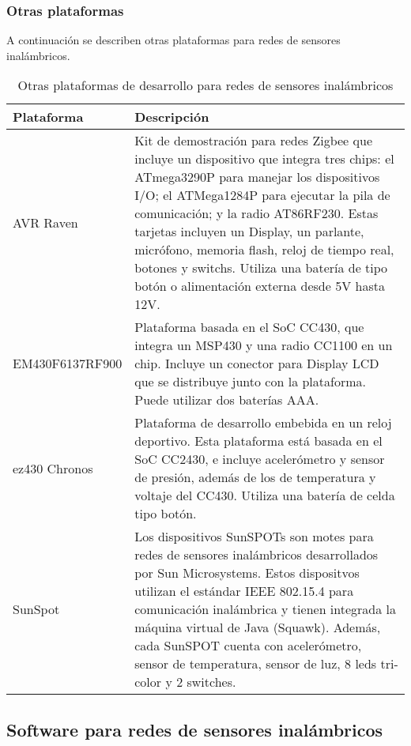 \subsubsection{Otras plataformas}
A continuación se describen otras plataformas para redes de sensores inalámbricos.
\begin{table}[H]
\centering
\caption{Otras plataformas de desarrollo para redes de sensores inalámbricos}
\begin{tabular}{|l|p{10cm}|}
\hline \textbf{Plataforma} & \textbf{Descripción} \\ 
\hline AVR Raven & Kit de demostración para redes Zigbee que incluye un dispositivo que integra tres chips: el ATmega3290P para manejar los dispositivos I/O; el ATMega1284P para ejecutar la pila de comunicación; y la radio AT86RF230. Estas tarjetas incluyen un Display, un parlante, micrófono, memoria flash, reloj de tiempo real, botones y switchs. Utiliza una batería de tipo botón o alimentación externa desde 5V hasta 12V.\\
\hline EM430F6137RF900 & Plataforma basada en el SoC CC430, que integra un MSP430 y una radio CC1100 en un chip. Incluye un conector para Display LCD que se distribuye junto con la plataforma. Puede utilizar dos baterías AAA. \\ 
\hline ez430 Chronos & Plataforma de desarrollo embebida en un reloj deportivo. Esta plataforma está basada en el SoC CC2430, e incluye acelerómetro y sensor de presión, además de los de temperatura y voltaje del CC430. Utiliza una batería de celda tipo botón.\\ 
\hline SunSpot & Los dispositivos SunSPOTs son motes para redes de sensores inalámbricos desarrollados por Sun Microsystems. Estos dispositvos utilizan el estándar IEEE 802.15.4 para comunicación inalámbrica y tienen integrada la máquina virtual de Java (Squawk). Además, cada SunSPOT cuenta con acelerómetro, sensor de temperatura, sensor de luz, 8 leds tri-color y 2 switches. \\ 
\hline 
\end{tabular} 
\end{table}


\subsection{Software para redes de sensores inalámbricos}
